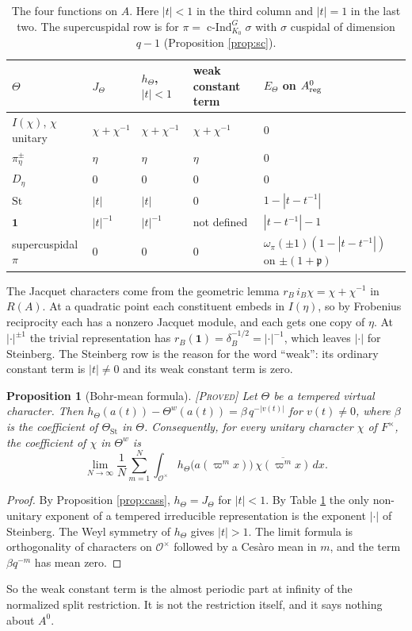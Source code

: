 \documentclass[12pt,letterpaper]{amsart}
\numberwithin{equation}{section}
\newtheorem{proposition}[theorem]{Proposition}
\theoremstyle{definition}
\theoremstyle{remark}
\newcommand{\St}{\mathrm{St}}
\newcommand{\triv}{\mathbf 1}
\newcommand{\status}[1]{\textup{[\textsc{#1}]}}
\begin{document}
\begin{table}[htbp]\centering\small
\caption{The four functions on $A$. Here $|t|<1$ in the third column and $|t|=1$ in the last two. The supercuspidal row is for $\pi=\operatorname{c-Ind}_{K_0}^G\sigma$ with $\sigma$ cuspidal of dimension $q-1$ (Proposition \ref{prop:sc}).}\label{tab:four}
\begin{tabular}{@{}lllll@{}}\toprule
$\Theta$ & $J_\Theta$ & $h_\Theta$, $|t|<1$ & weak constant term & $E_\Theta$ on $A^0_{\rm reg}$\\\midrule
$I(\chi)$, $\chi$ unitary & $\chi+\chi^{-1}$ & $\chi+\chi^{-1}$ & $\chi+\chi^{-1}$ & $0$\\
$\pi_\eta^\pm$ & $\eta$ & $\eta$ & $\eta$ & $0$\\
$D_\eta$ & $0$ & $0$ & $0$ & $0$\\
$\St$ & $|t|$ & $|t|$ & $0$ & $1-|t-t^{-1}|$\\
$\triv$ & $|t|^{-1}$ & $|t|^{-1}$ & not defined & $|t-t^{-1}|-1$\\
supercuspidal $\pi$ & $0$ & $0$ & $0$ & $\omega_\pi(\pm1)(1-|t-t^{-1}|)$ on $\pm(1+\mathfrak p)$\\\bottomrule
\end{tabular}
\end{table}
The Jacquet characters come from the geometric lemma $r_B\,i_B\chi=\chi+\chi^{-1}$ in $R(A)$. At a quadratic point each constituent embeds in $I(\eta)$, so by Frobenius reciprocity each has a nonzero Jacquet module, and each gets one copy of $\eta$. At $|\cdot|^{\pm1}$ the trivial representation has $r_B(\triv)=\delta_B^{-1/2}=|\cdot|^{-1}$, which leaves $|\cdot|$ for Steinberg. The Steinberg row is the reason for the word ``weak'': its ordinary constant term is $|t|\neq0$ and its weak constant term is zero.

\begin{proposition}[Bohr-mean formula]\label{prop:bohr}\status{Proved}
Let $\Theta$ be a tempered virtual character. Then $h_\Theta(a(t))-\Theta^w(a(t))=\beta\,q^{-|v(t)|}$ for $v(t)\ne0$, where $\beta$ is the coefficient of $\Theta_{\St}$ in $\Theta$. Consequently, for every unitary character $\chi$ of $F^\times$, the coefficient of $\chi$ in $\Theta^w$ is
\[
\lim_{N\to\infty}\frac1N\sum_{m=1}^N\int_{\mathcal O^\times}h_\Theta\bigl(a(\varpi^mx)\bigr)\,\overline{\chi(\varpi^mx)}\,dx .
\]
\end{proposition}
\begin{proof}
By Proposition \ref{prop:cass}, $h_\Theta=J_\Theta$ for $|t|<1$. By Table \ref{tab:four} the only non-unitary exponent of a tempered irreducible representation is the exponent $|\cdot|$ of Steinberg. The Weyl symmetry of $h_\Theta$ gives $|t|>1$. The limit formula is orthogonality of characters on $\mathcal O^\times$ followed by a Ces\`aro mean in $m$, and the term $\beta q^{-m}$ has mean zero.
\end{proof}
So the weak constant term is the almost periodic part at infinity of the normalized split restriction. It is not the restriction itself, and it says nothing about $A^0$.
\end{document}
